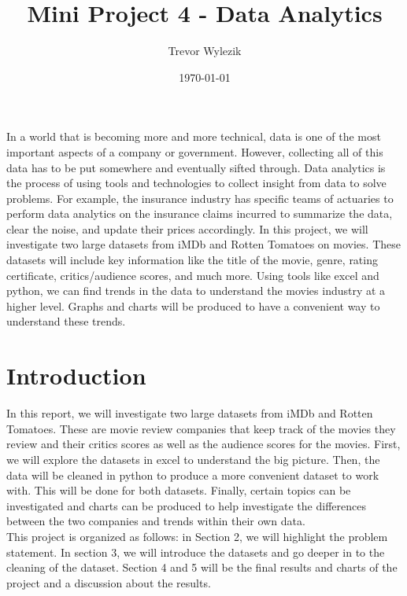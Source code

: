 \documentclass[12pt]{article}
\title{Mini Project 4 - Data Analytics}
\author{Trevor Wylezik}
\date{\today}
\begin{document}
\maketitle

\abstract
{\noindent
In a world that is becoming more and more technical, data is one of the most important aspects of a company or government. However, collecting all of this data has to be put somewhere and eventually sifted through. Data analytics is the process of using tools and technologies to collect insight from data to solve problems. For example, the insurance industry has specific teams of actuaries to perform data analytics on the insurance claims incurred to summarize the data, clear the noise, and update their prices accordingly. In this project, we will investigate two large datasets from iMDb and Rotten Tomatoes on movies. These datasets will include key information like the title of the movie, genre, rating certificate, critics/audience scores, and much more. Using tools like excel and python, we can find trends in the data to understand the movies industry at a higher level. Graphs and charts will be produced to have a convenient way to understand these trends.
}

\newpage


\section{Introduction}
In this report, we will investigate two large datasets from iMDb and Rotten Tomatoes. These are movie review companies that keep track of the movies they review and their critics scores as well as the audience scores for the movies. First, we will explore the datasets in excel to understand the big picture. Then, the data will be cleaned in python to produce a more convenient dataset to work with. This will be done for both datasets. Finally, certain topics can be investigated and charts can be produced to help investigate the differences between the two companies and trends within their own data. \\

\noindent This project is organized as follows: in Section 2, we will highlight the problem statement. In section 3, we will introduce the datasets and go deeper in to the cleaning of the dataset. Section 4 and 5 will be the final results and charts of the project and a discussion about the results. \\
\end{document}
